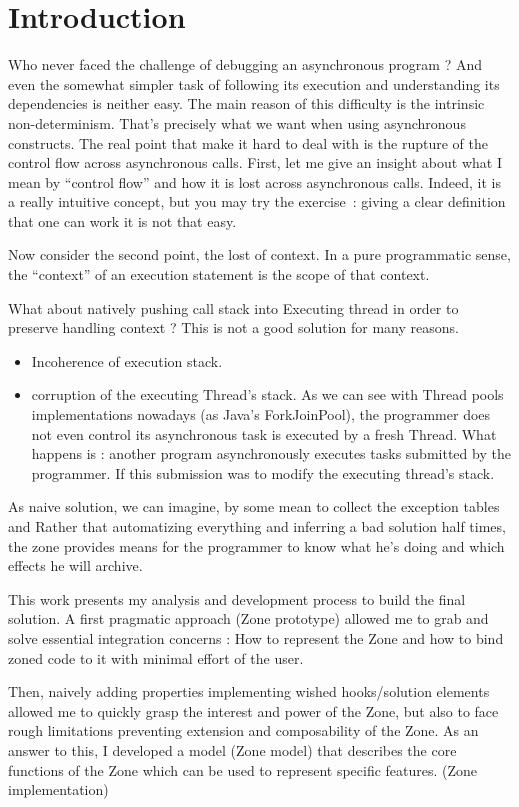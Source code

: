 
\chapter{Introduction}


Who never faced the challenge of debugging an asynchronous program ? And even the somewhat simpler task of following its execution and understanding its dependencies is neither easy.
The main reason of this difficulty is the intrinsic non-determinism. That's precisely what we want when using asynchronous constructs. The real point that make it hard to deal with is the rupture of the control flow across asynchronous calls.
First, let me give an insight about what I mean by ``control flow'' and how it is lost across asynchronous calls. Indeed, it is a really intuitive concept, but you may try the exercise~: giving a clear definition that one can work it is not that easy.

Now consider the second point, the lost of context. In a pure programmatic sense, the ``context'' of an execution statement is the scope of that context. 


What about natively pushing call stack into Executing thread in order to preserve handling context ? This is not a good solution for many reasons.
\begin{itemize}
\item Incoherence of execution stack. 
\item corruption of the executing Thread's stack. As we can see with Thread pools implementations nowadays (as Java's ForkJoinPool), the programmer does not even control its asynchronous task is executed by a fresh Thread. What happens is : another program asynchronously executes tasks submitted by the programmer. If this submission was to modify the executing thread's stack.
\end{itemize}
As naive solution, we can imagine, by some mean to collect the exception tables and 
Rather that automatizing everything and inferring a bad solution half times, the zone provides means for the programmer to know what he's doing and which effects he will archive.

This work presents my analysis and development process to build the final solution. A first pragmatic approach (Zone prototype) allowed me to grab and solve essential integration concerns : How to represent the Zone and how to bind zoned code to it with minimal effort of the user.

Then, naively adding properties implementing wished hooks/solution elements allowed me to quickly grasp the interest and power of the Zone, but also to face rough limitations preventing extension and composability of the Zone. As an answer to this, I developed a model (Zone model) that describes the core functions of the Zone which can be used to represent specific features. (Zone implementation)

